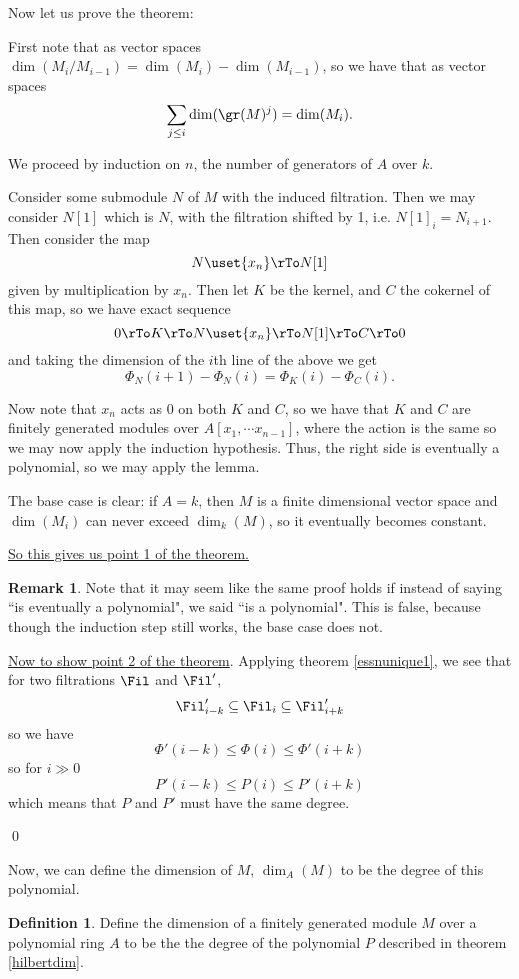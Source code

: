 \documentclass[12 pt]{article}
\theoremstyle{definition}
\newtheorem{defn}[thm]{Definition}
\newtheorem{rmk}[thm]{Remark}
\renewcommand{\(}{\left(}
\renewcommand{\)}{\right)}
\begin{document}
Now let us prove the theorem:


First note that as vector spaces $\dim(M_i/M_{i-1})=\dim(M_i)-\dim(M_{i-1})$, so we have that as vector spaces
\[\sum_{j \leq i} \dim(\gr(M)^j)=\dim(M_i).\]

We proceed by induction on $n$, the number of generators of $A$ over $k$.

Consider some submodule $N$ of $M$ with the induced filtration. Then we may consider $N[1]$ which is $N$, with the filtration shifted by 1, i.e. $N[1]_i=N_{i+1}$. Then consider the map
\[N \uset{x_n}\rTo N[1]\]
given by multiplication by $x_n$. Then let $K$ be the kernel, and $C$ the cokernel of this map, so we have exact sequence
\[0 \rTo K \rTo N \uset{x_n}\rTo N[1] \rTo C \rTo 0\]
and taking the dimension of the $i$th line of the above we get
\[\Phi_N(i+1)-\Phi_N(i)=\Phi_K(i)-\Phi_C(i).\]

Now note that $x_n$ acts as 0 on both $K$ and $C$, so we have that $K$ and $C$ are finitely generated modules over $A[x_1, \cdots x_{n-1}]$, where the action is the same so we may now apply the induction hypothesis. Thus, the right side is eventually a polynomial, so we may apply the lemma.

The base case is clear: if $A=k$, then $M$ is a finite dimensional vector space and $\dim(M_i)$ can never exceed $\dim_k(M)$, so it eventually becomes constant.

\uline{So this gives us point 1 of the theorem.}

\begin{rmk} Note that it may seem like the same proof holds if instead of saying ``is eventually a polynomial", we said ``is a polynomial". This is false, because though the induction step still works, the base case does not.
\end{rmk}

\uline{Now to show point 2 of the theorem}. Applying theorem \ref{essnunique1}, we see that for two filtrations $\Fil$ and $\Fil'$, \[\Fil'_{i-k} \subseteq \Fil_i \subseteq \Fil_{i+k}'\]
so we have
\[\Phi'(i-k) \leq \Phi(i) \leq \Phi'(i+k)\]
so for $i \gg 0$
\[P'(i-k) \leq P(i) \leq P'(i+k)\]
which means that $P$ and $P'$ must have the same degree.

\qed

Now, we can define the dimension of $M$, $\dim_A(M)$ to be the degree of this polynomial.

\begin{defn} Define the dimension of a finitely generated module $M$ over a polynomial ring $A$ to be the the degree of the polynomial $P$ described in theorem \ref{hilbertdim}.
\end{defn}
\end{document}
